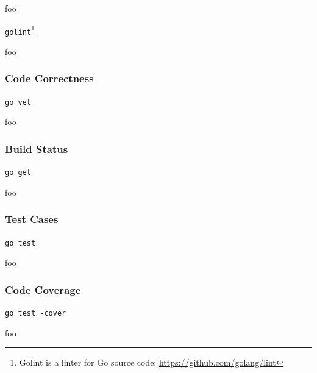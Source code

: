 

foo

\texttt{golint}\footnote{Golint is a linter for Go source code: \url{https://github.com/golang/lint}}

%

foo

\subsubsection{Code Correctness}

\texttt{go vet}

foo

\subsubsection{Build Status}

\texttt{go get}

foo

\subsubsection{Test Cases}

\texttt{go test}

foo

\subsubsection{Code Coverage}

\texttt{go test -cover}

foo
